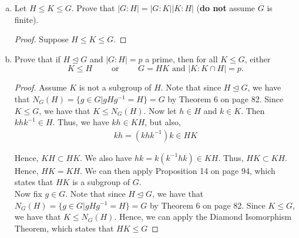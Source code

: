 \documentclass[11pt, reqno]{amsart}
\theoremstyle{plain}
\theoremstyle{definition}
\theoremstyle{example}
\def\normeq{\unlhd}
\begin{document}
\begin{enumerate}[1.]
\begin{enumerate}[(a)]
\item Let $H \leq K \leq G$. Prove that $|G:H| = |G:K||K:H|$ (\textbf{do not} assume $G$ is finite).

\begin{proof}
Suppose $H \leq K \leq G$.
\end{proof}

\item Prove that if $H \normeq G$ and $|G:H| = p$ a prime, then for all $K \leq G$, either 
$$K \leq H \qquad \text{ or } \qquad G = HK \text{ and } |K : K \cap H| = p.$$

\begin{proof}
Assume $K$ is not a subgroup of $H$. Note that since $H \normeq G$, we have that $N_G(H) = \{g \in G | gHg^{-1} = H\} = G$ by Theorem 6 on page 82. Since $K \leq G$, we have that $K \leq N_G(H)$. Now let $h \in H$ and $k \in K$. Then $khk^{-1} \in H$. Thus, we have $kh \in KH$, but also,
\begin{align*}
kh = (khk^{-1})k \in HK
\end{align*}

Hence, $KH \subset HK$. We also have $hk = k(k^{-1}hk) \in KH$. Thus, $HK \subset KH$. Hence, $HK = KH$. We can then apply Proposition 14 on page 94, which states that $HK$ is a subgroup of $G$.\\

Now fix $g \in G$.
Note that since $H \normeq G$, we have that $N_G(H) = \{g \in G | gHg^{-1} = H\} = G$ by Theorem 6 on page 82. Since $K \leq G$, we have that $K \leq N_G(H)$. Hence, we can apply the Diamond Isomorphism Theorem, which states that $HK \leq G$
\end{proof}

\end{enumerate}



\end{enumerate}
\end{document}
